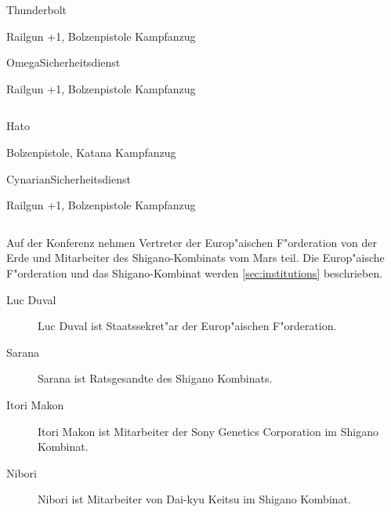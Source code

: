 \begin{column}[l]{0.45}
    \begin{nscsheet}[h]{Thunderbolt}
        \nscstats[ATT=3,AGG=3,CON=2]
        \nscruler
        \begin{nscinventory}
            \nscitem[Waffen] Railgun +1, Bolzenpistole
            \nscitem[R"ustung] Kampfanzug
        \end{nscinventory}
    \end{nscsheet}

    \begin{nscsheet}[h]{Omega\newline{}Sicherheitsdienst}
        \nscstats[ATT=3,AGG=3,CON=2]
        \nscruler
        \begin{nscinventory}
            \nscitem[Waffen] Railgun +1, Bolzenpistole
            \nscitem[R"ustung] Kampfanzug
        \end{nscinventory}
    \end{nscsheet}    
\end{column}
\begin{column}[r]{0.45}    
    \begin{nscsheet}[h]{Hato}
        \nscstats[ATT=3,AGG=3,CON=2]
        \nscruler
        \begin{nscinventory}
            \nscitem[Waffen] Bolzenpistole, Katana
            \nscitem[R"ustung] Kampfanzug
        \end{nscinventory}
    \end{nscsheet}

    \begin{nscsheet}[h]{Cynarian\newline{}Sicherheitsdienst}
        \nscstats[ATT=2,AGG=2]
        \nscruler
        \begin{nscinventory}
            \nscitem[Waffen] Railgun +1, Bolzenpistole
            \nscitem[R"ustung] Kampfanzug        
        \end{nscinventory}
    \end{nscsheet}    
\end{column}


Auf der Konferenz nehmen Vertreter der Europ"aischen F"orderation von der Erde und Mitarbeiter des Shigano-Kombinats vom Mars teil. Die Europ"aische F"orderation und das Shigano-Kombinat werden \cref{sec:institutions} beschrieben.

\begin{description}
    \item [Luc Duval] Luc Duval ist Staatssekret"ar der Europ"aischen F"orderation.
    \item [Sarana] Sarana ist Ratsgesandte des Shigano Kombinats.
    \item [Itori Makon] Itori Makon ist Mitarbeiter der Sony Genetics Corporation im Shigano Kombinat.
    \item [Nibori] Nibori ist Mitarbeiter von Dai-kyu Keitsu im Shigano Kombinat.
\end{description}
